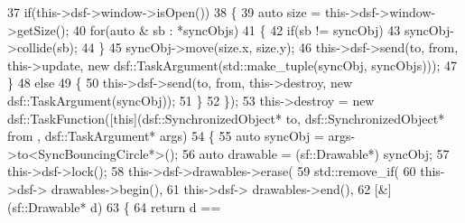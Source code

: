 \begin{DoxyCodeInclude}
37                                              \textcolor{keywordflow}{if}(this->dsf->window->isOpen())
38                                              \{
39                                                  \textcolor{keyword}{auto} size = this->dsf->window->getSize();
40                                                  \textcolor{keywordflow}{for}(\textcolor{keyword}{auto} & sb : *syncObjs)
41                                                  \{
42                                                      \textcolor{keywordflow}{if}(sb != syncObj)
43                                                          syncObj->collide(sb);
44                                                  \}
45                                                  syncObj->move(size.x, size.y);
46                                                  this->dsf->send(to, from, this->update, \textcolor{keyword}{new} 
      dsf::TaskArgument(std::make\_tuple(syncObj, syncObjs)));
47                                              \}
48                                              \textcolor{keywordflow}{else}
49                                              \{
50                                                  this->dsf->send(to, from, this->destroy, \textcolor{keyword}{new} 
      dsf::TaskArgument(syncObj));
51                                              \}
52                                          \});
53     this->destroy = \textcolor{keyword}{new} dsf::TaskFunction([\textcolor{keyword}{this}](dsf::SynchronizedObject* to, dsf::SynchronizedObject* from
      , dsf::TaskArgument* args)
54                                           \{
55                                               \textcolor{keyword}{auto} syncObj = args->to<SyncBouncingCircle*>();
56                                               \textcolor{keyword}{auto} drawable = (sf::Drawable*) syncObj;
57                                               this->dsf->lock();
58                                               this->dsf->drawables->erase(
59                                                                           std::remove\_if(
60                                                                                          this->dsf->
      drawables->begin(),
61                                                                                          this->dsf->
      drawables->end(),
62                                                                                          [&](sf::Drawable* 
      d)
63                                                                                          \{
64                                                                                              \textcolor{keywordflow}{return} d == 

\end{DoxyCodeInclude}
